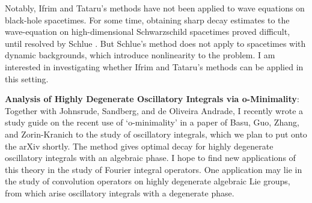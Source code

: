 \documentclass[11pt]{article}
\begin{document}
Notably, Ifrim and Tataru's methods have not been applied to wave equations on black-hole spacetimes. For some time, obtaining sharp decay estimates to the wave-equation on high-dimensional Schwarzschild spacetimes proved difficult, until resolved by Schlue \cite{Schlue}. But Schlue's method does not apply to spacetimes with dynamic backgrounds, which introduce nonlinearity to the problem. I am interested in investigating whether Ifrim and Tataru's methods can be applied in this setting.

{\bf Analysis of Highly Degenerate Oscillatory Integrals via o-Minimality}: Together with Johnsrude, Sandberg, and de Oliveira Andrade, I recently wrote a study guide on the recent use of `o-minimality' in a paper of Basu, Guo, Zhang, and Zorin-Kranich \cite{BasuGuoZhangZorinKranich} to the study of oscillatory integrals, which we plan to put onto the arXiv shortly. The method gives optimal decay for highly degenerate oscillatory integrals with an algebraic phase. I hope to find new applications of this theory in the study of Fourier integral operators. One application may lie in the study of convolution operators on highly degenerate algebraic Lie groups, from which arise oscillatory integrals with a degenerate phase.

\pagebreak[4]

\end{document}
